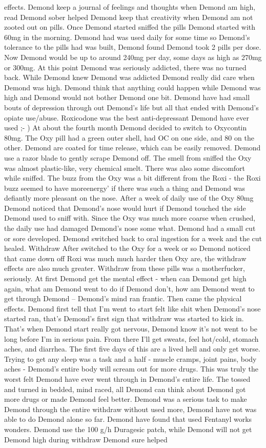 \documentclass[12pt]{book}
\begin{document}
effects. Demond keep a journal of feelings and thoughts when Demond am high, read Demond sober helped Demond keep that creativity when Demond am not zooted out on pills. Once Demond started sniffed the pills Demond started with 60mg in the morning. Demond had was used daily for some time so Demond's tolerance to the pills had was built, Demond found Demond took 2 pills per dose. Now Demond would be up to around 240mg per day, some days as high as 270mg or 300mg. At this point Demond was seriously addicted, there was no turned back. While Demond knew Demond was addicted Demond really did care when Demond was high. Demond think that anything could happen while Demond was high and Demond would not bother Demond one bit. Demond have had small bouts of depression through out Demond's life but all that ended with Demond's opiate use/abuse. Roxicodone was the best anti-depressant Demond have ever used ;- ) At about the fourth month Demond decided to switch to Oxycontin 80mg. The Oxy pill had a green outer shell, had OC on one side, and 80 on the other. Demond are coated for time release, which can be easily removed. Demond use a razor blade to gently scrape Demond off. The smell from sniffed the Oxy was almost plastic-like, very chemical smelt. There was also some discomfort while sniffed. The buzz from the Oxy was a bit different from the Roxi - the Roxi buzz seemed to have moreenergy' if there was such a thing and Demond was defiantly more pleasant on the nose. After a week of daily use of the Oxy 80mg Demond noticed that Demond's nose would hurt if Demond touched the side Demond used to sniff with. Since the Oxy was much more coarse when crushed, the daily use had damaged Demond's nose some what. Demond had a small cut or sore developed. Demond switched back to oral ingestion for a week and the cut healed. Withdraw After switched to the Oxy for a week or so Demond noticed that came down off Roxi was much much harder then Oxy are, the withdraw effects are also much greater. Withdraw from these pills was a motherfucker, seriously. At first Demond get the mental effect - when can Demond get high again, what am Demond went to do if Demond don't, how am Demond went to get through Demond -- Demond's mind ran frantic. Then came the physical effects. Demond first tell that I'm went to start felt like shit when Demond's nose started ran, that's Demond's first sign that withdraw was started to kick in. That's when Demond start really got nervous, Demond know it's not went to be long before I'm in serious pain. From there I'll get sweats, feel hot/cold, stomach aches, and diarrhea. The first five days of this are a lived hell and only get worse. Trying to get any sleep was a task and a half - muscle cramps, joint pains, body aches - Demond's entire body will scream out for more drugs. This was truly the worst felt Demond have ever went through in Demond's entire life. The tossed and turned in bedded, mind raced, all Demond can think about Demond got more drugs or made Demond feel better. Demond was a serious task to make Demond through the entire withdraw without used more, Demond have not was able to do Demond alone so far. Demond have found that used Fentanyl works wonders. Demond use the 100 g/h Duragesic patch, while Demond will not get Demond high during withdraw Demond sure helped 
\end{document}
